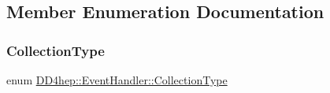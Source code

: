 \subsection{Member Enumeration Documentation}
\hypertarget{class_d_d4hep_1_1_event_handler_a0b22a141a019364495835317fad48254}{}\label{class_d_d4hep_1_1_event_handler_a0b22a141a019364495835317fad48254} 
\subsubsection{\texorpdfstring{Collection\+Type}{CollectionType}}
{\footnotesize\ttfamily enum \hyperlink{class_d_d4hep_1_1_event_handler_a0b22a141a019364495835317fad48254}{D\+D4hep\+::\+Event\+Handler\+::\+Collection\+Type}}

